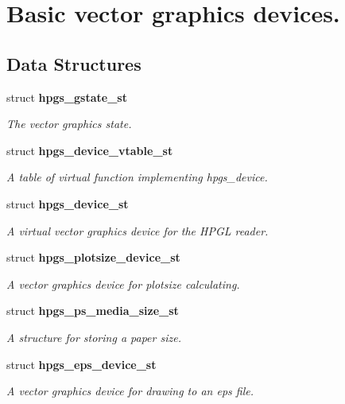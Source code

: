 \section{Basic vector graphics devices.}
\label{group__device}
\subsection*{Data Structures}
\begin{DoxyCompactItemize}
\item 
struct {\bf hpgs\_\-gstate\_\-st}
\begin{DoxyCompactList}\small\item\em The vector graphics state. \item\end{DoxyCompactList}\item 
struct {\bf hpgs\_\-device\_\-vtable\_\-st}
\begin{DoxyCompactList}\small\item\em A table of virtual function implementing {\ttfamily hpgs\_\-device}. \item\end{DoxyCompactList}\item 
struct {\bf hpgs\_\-device\_\-st}
\begin{DoxyCompactList}\small\item\em A virtual vector graphics device for the HPGL reader. \item\end{DoxyCompactList}\item 
struct {\bf hpgs\_\-plotsize\_\-device\_\-st}
\begin{DoxyCompactList}\small\item\em A vector graphics device for plotsize calculating. \item\end{DoxyCompactList}\item 
struct {\bf hpgs\_\-ps\_\-media\_\-size\_\-st}
\begin{DoxyCompactList}\small\item\em A structure for storing a paper size. \item\end{DoxyCompactList}\item 
struct {\bf hpgs\_\-eps\_\-device\_\-st}
\begin{DoxyCompactList}\small\item\em A vector graphics device for drawing to an eps file. \item\end{DoxyCompactList}\end{DoxyCompactItemize}
